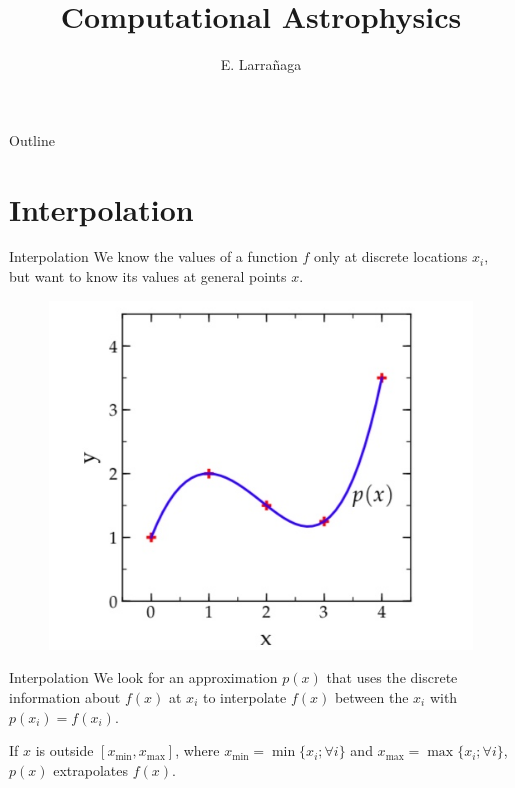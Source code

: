 \documentclass[11pt]{beamer}
\begin{document}
\begin{frame}
\title{Computational Astrophysics}
\author{E. Larrañaga}
\titlepage
\end{frame}

\begin{frame}{Outline}
\tableofcontents
\end{frame}

\section{Interpolation}

\begin{frame}[fragile]{Interpolation}
We know the values of a function $f$ only at discrete locations $x_i$, but want to
know its values at general points $x$.
\begin{figure}
\includegraphics[scale=0.3]{interpolation.jpeg}
\end{figure}
\end{frame}

\begin{frame}[fragile]{Interpolation}
We  look for an approximation
$p(x)$ that uses the discrete information about $f(x)$ at $x_i$ to
interpolate $f(x)$ between the $x_i$ with $p(x_i) = f(x_i)$. \\
\pause
\bigskip 

If $x$ is
outside $[x_\mathrm{min},x_\mathrm{max}]$, where $x_\mathrm{min} =
\min \{x_i; \forall i\}$ and $x_\mathrm{max} = \max \{x_i; \forall i\}$,
$p(x)$ extrapolates $f(x)$.
\end{frame}
\end{document}
